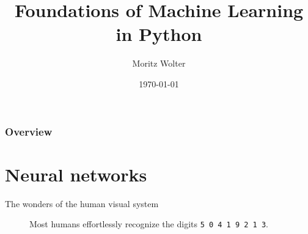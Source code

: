 \documentclass[notes]{beamer}
\title{Foundations of Machine Learning in Python}
\date{\today}
\institute{High-Performance Computing and Analytics Lab}
\author{Moritz Wolter}
\begin{document}
    \maketitle

    \begin{frame}
    \frametitle{Overview} 
    \tableofcontents
    \end{frame}

    \section{Neural networks}
    \begin{frame}{The wonders of the human visual system}
      \begin{figure}
        
        \caption{Most humans effortlessly recognize the digits \texttt{5 0 4 1 9 2 1 3}.}
      \end{figure}
    \end{frame}
\end{document}
